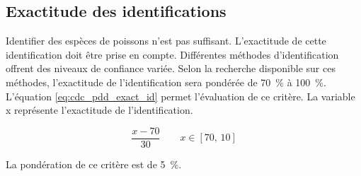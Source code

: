 

\subsection{Exactitude des identifications}
\label{s:cdc_pdd_exact_id}

Identifier des espèces de poissons n’est pas suffisant. L’exactitude de cette identification doit être prise en compte. Différentes méthodes d’identification offrent des niveaux de confiance variée. Selon la recherche disponible sur ces méthodes\cite{10.1093/icesjms/fsx109}, l’exactitude de l’identification sera pondérée de 70~\% à 100~\%. L’équation \ref{eq:cdc_pdd_exact_id} permet l’évaluation de ce critère. La variable x représente l'exactitude de l'identification.

\begin{equation} \label{eq:cdc_pdd_exact_id}
\frac{x-70}{30} \qquad x \in [70,\,10]
\end{equation}


La pondération de ce critère est de 5~\%.


